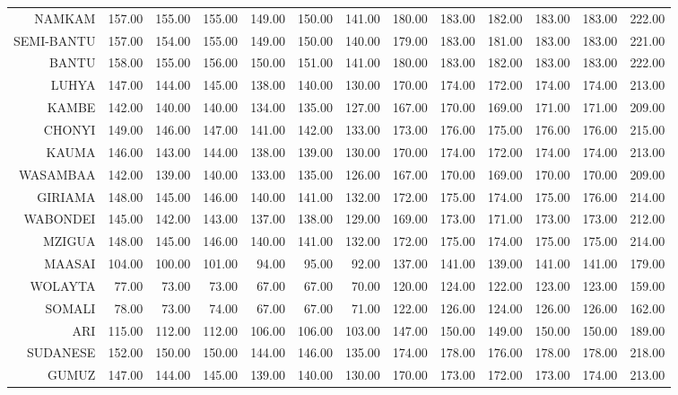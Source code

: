 \begin{longtable}{rrrrrrrrrrrrr}
  NAMKAM & 157.00 & 155.00 & 155.00 & 149.00 & 150.00 & 141.00 & 180.00 & 183.00 & 182.00 & 183.00 & 183.00 & 222.00 \\ 
  SEMI-BANTU & 157.00 & 154.00 & 155.00 & 149.00 & 150.00 & 140.00 & 179.00 & 183.00 & 181.00 & 183.00 & 183.00 & 221.00 \\ 
  BANTU & 158.00 & 155.00 & 156.00 & 150.00 & 151.00 & 141.00 & 180.00 & 183.00 & 182.00 & 183.00 & 183.00 & 222.00 \\ 
   \hline 
LUHYA & 147.00 & 144.00 & 145.00 & 138.00 & 140.00 & 130.00 & 170.00 & 174.00 & 172.00 & 174.00 & 174.00 & 213.00 \\ 
  KAMBE & 142.00 & 140.00 & 140.00 & 134.00 & 135.00 & 127.00 & 167.00 & 170.00 & 169.00 & 171.00 & 171.00 & 209.00 \\ 
  CHONYI & 149.00 & 146.00 & 147.00 & 141.00 & 142.00 & 133.00 & 173.00 & 176.00 & 175.00 & 176.00 & 176.00 & 215.00 \\ 
  KAUMA & 146.00 & 143.00 & 144.00 & 138.00 & 139.00 & 130.00 & 170.00 & 174.00 & 172.00 & 174.00 & 174.00 & 213.00 \\ 
  WASAMBAA & 142.00 & 139.00 & 140.00 & 133.00 & 135.00 & 126.00 & 167.00 & 170.00 & 169.00 & 170.00 & 170.00 & 209.00 \\ 
  GIRIAMA & 148.00 & 145.00 & 146.00 & 140.00 & 141.00 & 132.00 & 172.00 & 175.00 & 174.00 & 175.00 & 176.00 & 214.00 \\ 
  WABONDEI & 145.00 & 142.00 & 143.00 & 137.00 & 138.00 & 129.00 & 169.00 & 173.00 & 171.00 & 173.00 & 173.00 & 212.00 \\ 
  MZIGUA & 148.00 & 145.00 & 146.00 & 140.00 & 141.00 & 132.00 & 172.00 & 175.00 & 174.00 & 175.00 & 175.00 & 214.00 \\ 
   \hline 
MAASAI & 104.00 & 100.00 & 101.00 & 94.00 & 95.00 & 92.00 & 137.00 & 141.00 & 139.00 & 141.00 & 141.00 & 179.00 \\ 
  WOLAYTA & 77.00 & 73.00 & 73.00 & 67.00 & 67.00 & 70.00 & 120.00 & 124.00 & 122.00 & 123.00 & 123.00 & 159.00 \\ 
  SOMALI & 78.00 & 73.00 & 74.00 & 67.00 & 67.00 & 71.00 & 122.00 & 126.00 & 124.00 & 126.00 & 126.00 & 162.00 \\ 
  ARI & 115.00 & 112.00 & 112.00 & 106.00 & 106.00 & 103.00 & 147.00 & 150.00 & 149.00 & 150.00 & 150.00 & 189.00 \\ 
  SUDANESE & 152.00 & 150.00 & 150.00 & 144.00 & 146.00 & 135.00 & 174.00 & 178.00 & 176.00 & 178.00 & 178.00 & 218.00 \\ 
  GUMUZ & 147.00 & 144.00 & 145.00 & 139.00 & 140.00 & 130.00 & 170.00 & 173.00 & 172.00 & 173.00 & 174.00 & 213.00 \\ 

\end{longtable}

